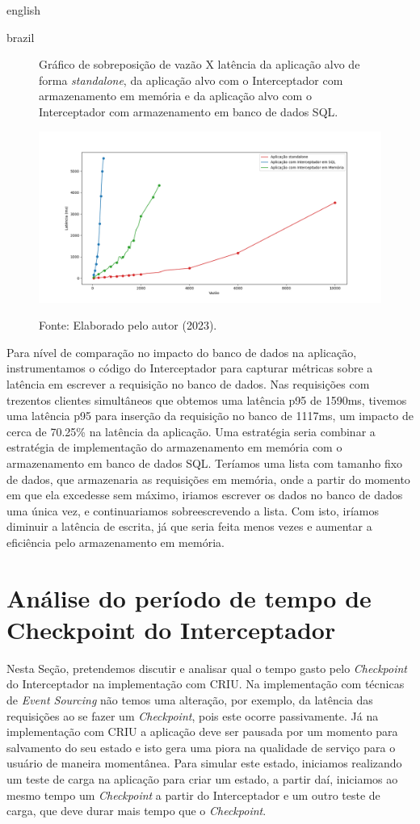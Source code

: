 \begin{otherlanguage*}{english}
\begin{otherlanguage*}{brazil}
\begin{figure}[h]
\centering
\caption{Gráfico de sobreposição de vazão X latência da aplicação alvo de forma \textit{standalone}, da aplicação alvo com o Interceptador com armazenamento em memória e da aplicação alvo com o Interceptador com armazenamento em banco de dados SQL.}
\includegraphics[scale=0.46]{images/vazaoxlatencia.png}
\label{fig:analysis-interceptor-standalone}
\caption*{Fonte: Elaborado pelo autor (2023).}
\end{figure}

Para nível de comparação no impacto do banco de dados na aplicação, instrumentamos o
código do Interceptador para capturar métricas sobre a latência em escrever a requisição
no banco de dados. Nas requisições com trezentos clientes simultâneos que obtemos uma
latência p95 de 1590ms, tivemos uma latência p95 para inserção da requisição no banco
de 1117ms, um impacto de cerca de 70.25\% na latência da aplicação. Uma estratégia seria combinar
a estratégia de implementação do armazenamento em memória com o armazenamento em banco de
dados SQL. Teríamos uma lista com tamanho fixo de dados, que armazenaria as requisições em
memória, onde a partir do momento em que ela excedesse sem máximo, iriamos escrever os dados no
banco de dados uma única vez, e continuariamos sobreescrevendo a lista. Com isto,
iríamos diminuir a latência de escrita, já que seria feita menos vezes e aumentar a
eficiência pelo armazenamento em memória.

\section{Análise do período de tempo de Checkpoint do Interceptador}

Nesta Seção, pretendemos discutir e analisar qual o tempo gasto pelo \textit{Checkpoint} do
Interceptador na implementação com CRIU. Na implementação com técnicas de
\textit{Event Sourcing} não temos uma alteração, por exemplo, da latência das requisições ao
se fazer um \textit{Checkpoint}, pois este ocorre passivamente. Já na implementação com CRIU
a aplicação deve ser pausada por um momento para salvamento do seu estado e isto gera uma
piora na qualidade de serviço para o usuário de maneira momentânea. Para simular este estado,
iniciamos realizando um teste de carga na aplicação para criar um estado, a partir daí, iniciamos
ao mesmo tempo um \textit{Checkpoint} a partir do Interceptador e um outro teste de carga, que deve
durar mais tempo que o \textit{Checkpoint}.


\end{otherlanguage*}
\end{otherlanguage*}
